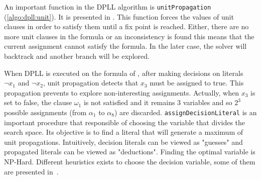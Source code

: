 

An important function in the DPLL algorithm is \texttt{unitPropagation} (\cref{algo:dpll:unit}).
It is presented in . This function forces the values of unit clauses in order to satisfy them
until a fix point is reached. Either, there
 are no more unit clauses in the formula or an inconsistency 
is found this means that the current assignment cannot satisfy the formula. In the later case, the solver will
backtrack and another branch will be explored.

When DPLL  is executed on the formula of , after making decisions on literals
$\neg x_1$ and $\neg x_2$, unit propagation detects that $x_3$ must be assigned to true.
This propagation prevents to explore non-interesting assignments. Actually, when $x_3$ is set to false,
the clause $\omega_1$ is not satisfied and it remains 3 variables and so $2^3$ possible assignments
(from $\alpha_1$ to $\alpha_8$) are discarded.
\texttt{assignDecisionLiteral} is an important procedure that responsible of choosing the variable that
divides the search space. Its objective is to find a literal that will generate a maximum of unit propagations. Intuitively, decision literals can be viewed as "guesses" and propagated literals can be viewed as "deductions". 
Finding the optimal variable is NP-Hard. Different heuristics exists to choose the decision variable,
some of them are presented in~.
%
%
